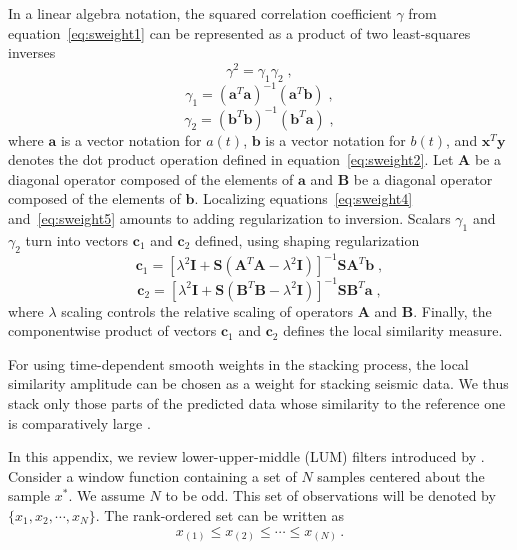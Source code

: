 In a linear algebra notation, the squared correlation coefficient $\gamma$
from equation~\ref{eq:sweight1} can be represented as a product of two
least-squares inverses
\begin{equation}
  \label{eq:sweight3}
     \gamma^2 = \gamma_1 \gamma_2\;,
\end{equation} 
\begin{equation}
  \label{eq:sweight4}
     \gamma_1 = (\mathbf{a}^T \mathbf{a})^{-1}(\mathbf{a}^T \mathbf{b})\;,
\end{equation} 
\begin{equation}
  \label{eq:sweight5}
     \gamma_2 = (\mathbf{b}^T \mathbf{b})^{-1}(\mathbf{b}^T \mathbf{a})\;,
\end{equation} 
where $\mathbf{a}$ is a vector notation for $a(t)$, $\mathbf{b}$ is a
vector notation for $b(t)$, and $\mathbf{x}^T \mathbf{y}$ denotes the
dot product operation defined in equation~\ref{eq:sweight2}. Let
$\mathbf{A}$ be a diagonal operator composed of the elements of
$\mathbf{a}$ and $\mathbf{B}$ be a diagonal operator composed of the
elements of $\mathbf{b}$. Localizing equations~\ref{eq:sweight4}
and~\ref{eq:sweight5} amounts to adding regularization to
inversion. Scalars $\gamma_1$ and $\gamma_2$ turn into vectors
$\mathbf{c}_1$ and $\mathbf{c}_2$ defined, using shaping
regularization \cite[]{Fomel07b}
\begin{equation}
  \label{eq:sweight6}
     \mathbf{c}_1 = [\lambda^2 \mathbf{I} + \mathbf{S}(\mathbf{A}^T \mathbf{A} - \lambda^2 \mathbf{I})]^{-1}\mathbf{S}\mathbf{A}^T\mathbf{b}\;,
\end{equation} 
\begin{equation}
  \label{eq:sweight7}
     \mathbf{c}_2 = [\lambda^2 \mathbf{I} + \mathbf{S}(\mathbf{B}^T \mathbf{B} - \lambda^2 \mathbf{I})]^{-1}\mathbf{S}\mathbf{B}^T\mathbf{a}\;,
\end{equation} 
where $\lambda$ scaling controls the relative scaling of operators
$\mathbf{A}$ and $\mathbf{B}$. Finally, the componentwise product of
vectors $\mathbf{c}_1$ and $\mathbf{c}_2$ defines the local similarity
measure.

For using time-dependent smooth weights in the stacking process, the
local similarity amplitude can be chosen as a weight for stacking
seismic data. We thus stack only those parts of the predicted data whose
similarity to the reference one is comparatively large \cite[]{Liu09b}.


In this appendix, we review lower-upper-middle (LUM)
filters introduced by \cite{Hardie93}. Consider a window function
containing a set of $N$ samples centered about the sample $x^*$. We
assume $N$ to be odd. This set of observations will be denoted by
$\{x_1,x_2,\cdots,x_N\}$. The rank-ordered set can be written as
\begin{equation}
   x_{(1)} \le x_{(2)} \le \cdots \le x_{(N)}\,.
  \label{eq:lum1}
\end{equation}

